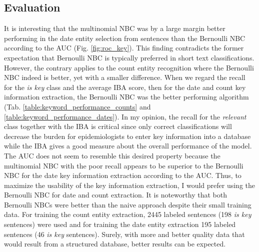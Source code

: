 \subsection{Evaluation}\label{eval_key}
  It is interesting that the multinomial NBC was by a large margin better performing in the date entity selection from sentences than the Bernoulli NBC according to the AUC (Fig. \ref{fig:roc_key}).
  This finding contradicts the former expectation that Bernoulli NBC is typically preferred in short text classifications.
  However, the contrary applies to the count entity recognition where the Bernoulli NBC indeed is better, yet with a smaller difference.
  When we regard the recall for the \textsl{is key} class and the average IBA score, then for the date and count key information extraction, the Bernoulli NBC was the better performing algorithm (Tab. \ref{table:keyword_performance_counts} and \ref{table:keyword_performance_dates}).
  In my opinion, the recall for the \textsl{relevant} class together with the IBA is critical since only correct classifications will decrease the burden for epidemiologists to enter key information into a database while the IBA gives a good measure about the overall performance of the model.
  The AUC does not seem to resemble this desired property because the multinomial NBC with the poor recall appears to be superior to the Bernoulli NBC for the date key information extraction according to the AUC.
  Thus, to maximize the usability of the key information extraction, I would prefer using the Bernoulli NBC for date and count extraction.
  It is noteworthy that both Bernoulli NBCs were better than the naive approach despite their small training data. For training the count entity extraction, 2445 labeled sentences (198 \textsl{is key} sentences) were used and for training the date entity extraction 195 labeled sentences (46 \textsl{is key} sentences).
  Surely, with more and better quality data that would result from a structured database, better results can be expected.

